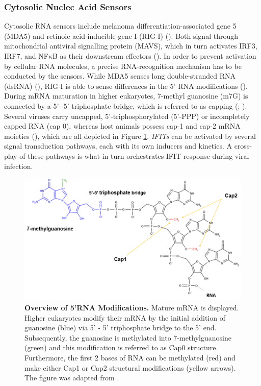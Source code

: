 \subsubsection{Cytosolic Nuclec Acid Sensors} \label{Cytosolic Nuclec Acid Sensors}
Cytosolic RNA sensors include melanoma differentiation-associated gene 5 (MDA5) and retinoic acid-inducible gene I (RIG-I) (\cite{Vladimer2014IFITs:Proteins}). Both signal through mitochondrial antiviral signalling protein (MAVS), which in turn activates IRF3, IRF7, and NF\(\kappa\)B as their downstream effectors (\cite{Ashley2019Interferon-IndependentCytomegalovirus}). In order to prevent activation by cellular RNA molecules, a precise RNA-recognition mechanism has to be conducted by the sensors. While MDA5 senses long double-stranded RNA (dsRNA) (\cite{Brisse2019ComparativeMDA5.}), RIG-I is able to sense differences in the 5’ RNA modifications (\cite{Schlee2016DiscriminatingSensing}). During mRNA maturation in higher eukaryotes, 7-methyl guanosine (m7G) is connected by a 5'- 5' triphosphate bridge, which is referred to as capping (\cite{Devarkar2016StructuralRIG-I}; \cite{Ramanathan2016MRNAApplications}). Several viruses carry uncapped, 5'-triphosphorylated (5'-PPP) or incompletely capped RNA (cap 0), whereas host animals possess cap-1 and cap-2 mRNA moieties (\cite{Choi2018ACaps}), which are all depicted in Figure \ref{fig:Overview of 5'RNA Modifications.}. \textit{IFITs} can be activated by several signal transduction pathways, each with its own inducers and kinetics. A cross-play of these pathways is what in turn orchestrates IFIT response during viral infection.

\begin{figure}
    \centering
    \includegraphics[width=0.75\linewidth]{04. Introduction//Figs/02. 5-RNA Modifications.png}
    \caption[Overview of 5'RNA Modifications.]{\textbf{Overview of 5'RNA Modifications.} Mature mRNA is displayed. Higher eukaryotes modify their mRNA by the initial addition of guanosine (blue) via 5' - 5' triphosphate bridge to the 5' end. Subsequently, the guanosine is methylated into 7-methylguanosine (green) and this modification is referred to as Cap0 structure. Furthermore, the first 2 bases of RNA can be methylated (red) and make either Cap1 or Cap2 structural modifications (yellow arrows). The figure was adapted from \cite{Picard-Jean2013RNAGenomes}.}
    \label{fig:Overview of 5'RNA Modifications.}
\end{figure}

